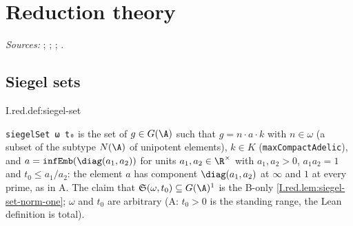 
\chapter{Reduction theory}\label{ch:ch-0-08-reduction}

\noindent\emph{Sources:} \cite{Bor-fin}; \cite[§§2, 6]{AIntro}; \cite[§1]{A-R1}; \cite[Lecture II]{Gel}.

\section{Siegel sets}
\begin{definition}
\end{definition}
\begin{tfformal}{I.red.def:siegel-set}
\begin{tffidelity}
\texttt{siegelSet ω t₀} is the set of $g\in G(\A)$ such that $g=n\cdot a\cdot k$ with $n\in\omega$ (a subset of the subtype $N(\A)$ of unipotent elements), $k\in K$ (\texttt{maxCompactAdelic}), and $a=\texttt{infEmb}(\diag(a_1,a_2))$ for units $a_1,a_2\in\R^\times$ with $a_1,a_2>0$, $a_1a_2=1$ and $t_0\le a_1/a_2$: the element $a$ has component $\diag(a_1,a_2)$ at $\infty$ and $1$ at every prime, as in A. The claim that $\mathfrak S(\omega,t_0)\subseteq G(\A)^1$ is the B-only \cref{I.red.lem:siegel-set-norm-one}; $\omega$ and $t_0$ are arbitrary (A: $t_0>0$ is the standing range, the Lean definition is total).
\end{tffidelity}
\end{tfformal}

